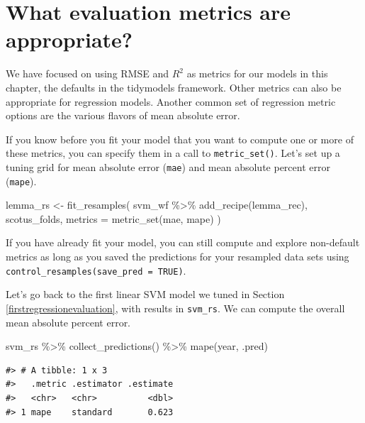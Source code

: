 \documentclass[
]{krantz}
\makeatletter
\newenvironment{Shaded}{\begin{snugshade}}{\end{snugshade}}
\newcommand{\AttributeTok}[1]{\textcolor[rgb]{0.77,0.63,0.00}{#1}}
\newcommand{\FunctionTok}[1]{\textcolor[rgb]{0.00,0.00,0.00}{#1}}
\newcommand{\NormalTok}[1]{#1}
\newcommand{\OtherTok}[1]{\textcolor[rgb]{0.56,0.35,0.01}{#1}}
\newcommand{\SpecialCharTok}[1]{\textcolor[rgb]{0.00,0.00,0.00}{#1}}
\newenvironment{kframe}{%
\medskip{}
\setlength{\fboxsep}{.8em}
 \def\at@end@of@kframe{}%
 \ifinner\ifhmode%
  \def\at@end@of@kframe{\end{minipage}}%
  \begin{minipage}{\columnwidth}%
 \fi\fi%
 \def\FrameCommand##1{\hskip\@totalleftmargin \hskip-\fboxsep
 \colorbox{shadecolor}{##1}\hskip-\fboxsep
     \hskip-\linewidth \hskip-\@totalleftmargin \hskip\columnwidth}%
 \MakeFramed {\advance\hsize-\width
   \@totalleftmargin\z@ \linewidth\hsize
   \@setminipage}}%
 {\par\unskip\endMakeFramed%
 \at@end@of@kframe}
\renewenvironment{Shaded}{\begin{kframe}}{\end{kframe}}
\makeatother
\begin{document}
\hypertarget{what-evaluation-metrics-are-appropriate}{%
\section{What evaluation metrics are appropriate?}\label{what-evaluation-metrics-are-appropriate}}

We have focused on using RMSE and \(R^2\) as metrics for our models in this chapter, the defaults in the tidymodels framework. Other metrics can also be appropriate for regression models. Another common set of regression metric options are the various flavors of mean absolute error.

If you know before you fit your model that you want to compute one or more of these metrics, you can specify them in a call to \texttt{metric\_set()}. Let's set up a tuning grid for mean absolute error (\texttt{mae}) and mean absolute percent error (\texttt{mape}).

\begin{Shaded}
\begin{Highlighting}[]
\NormalTok{lemma\_rs }\OtherTok{\textless{}{-}} \FunctionTok{fit\_resamples}\NormalTok{(}
\NormalTok{  svm\_wf }\SpecialCharTok{\%\textgreater{}\%} \FunctionTok{add\_recipe}\NormalTok{(lemma\_rec),}
\NormalTok{  scotus\_folds,}
  \AttributeTok{metrics =} \FunctionTok{metric\_set}\NormalTok{(mae, mape)}
\NormalTok{)}
\end{Highlighting}
\end{Shaded}

If you have already fit your model, you can still compute and explore non-default metrics as long as you saved the predictions for your resampled data sets using \texttt{control\_resamples(save\_pred\ =\ TRUE)}.

Let's go back to the first linear SVM model we tuned in Section \ref{firstregressionevaluation}, with results in \texttt{svm\_rs}. We can compute the overall mean absolute percent error.

\begin{Shaded}
\begin{Highlighting}[]
\NormalTok{svm\_rs }\SpecialCharTok{\%\textgreater{}\%}
  \FunctionTok{collect\_predictions}\NormalTok{() }\SpecialCharTok{\%\textgreater{}\%}
  \FunctionTok{mape}\NormalTok{(year, .pred)}
\end{Highlighting}
\end{Shaded}

\begin{verbatim}
#> # A tibble: 1 x 3
#>   .metric .estimator .estimate
#>   <chr>   <chr>          <dbl>
#> 1 mape    standard       0.623
\end{verbatim}
\end{document}
